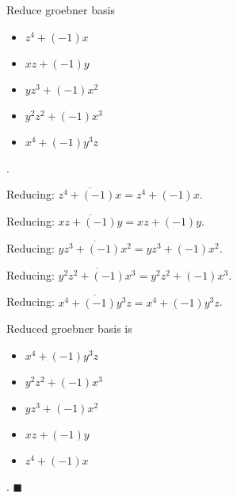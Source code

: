 \documentclass{jsarticle}
\begin{document}
Reduce groebner basis 
\begin{itemize}
\item $z^{4}+(-1)x$
\item $xz+(-1)y$
\item $yz^{3}+(-1)x^{2}$
\item $y^{2}z^{2}+(-1)x^{3}$
\item $x^{4}+(-1)y^{3}z$
\end{itemize}  . 


Reducing: $\overline{z^{4}+(-1)x} = z^{4}+(-1)x$.  

Reducing: $\overline{xz+(-1)y} = xz+(-1)y$.  

Reducing: $\overline{yz^{3}+(-1)x^{2}} = yz^{3}+(-1)x^{2}$.  

Reducing: $\overline{y^{2}z^{2}+(-1)x^{3}} = y^{2}z^{2}+(-1)x^{3}$.  

Reducing: $\overline{x^{4}+(-1)y^{3}z} = x^{4}+(-1)y^{3}z$.  

Reduced groebner basis is 
\begin{itemize}
\item $x^{4}+(-1)y^{3}z$
\item $y^{2}z^{2}+(-1)x^{3}$
\item $yz^{3}+(-1)x^{2}$
\item $xz+(-1)y$
\item $z^{4}+(-1)x$
\end{itemize}  . 
$\blacksquare{}$
\end{document}
